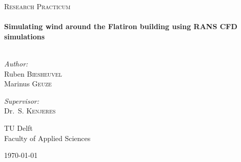 \begin{titlepage}
\begin{center}



\textsc{\Large Research Practicum}\\[0.5cm]

\HRule \\[0.4cm]
{ \huge \bfseries Simulating wind around the Flatiron building using RANS CFD simulations}\\[0.4cm]

\HRule \\[1.5cm]

\begin{minipage}{0.45\textwidth}
\begin{flushleft} \large
\emph{Author:}\\
Ruben \textsc{Biesheuvel}\\
Marinus \textsc{Geuze}
\end{flushleft}
\end{minipage}
\begin{minipage}{0.45\textwidth}
\begin{flushright} \large
\emph{Supervisor:} \\
Dr.~S. \textsc{Kenjeres}

\end{flushright}
\end{minipage}

\vfill

\begin{minipage}{0.45\textwidth}
\begin{flushleft}
{\large TU Delft}\\
{\normalsize Faculty of Applied Sciences}
\end{flushleft}
\end{minipage}
\begin{minipage}{0.45\textwidth}
\begin{flushright}
{\large \today}
\end{flushright}
\end{minipage}




\end{center}
\end{titlepage}